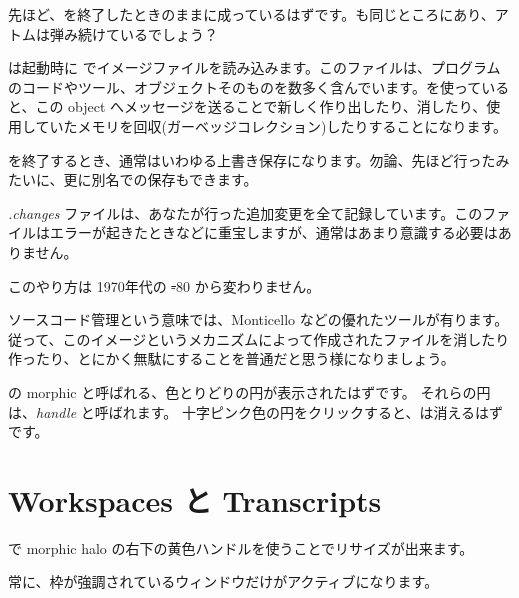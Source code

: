 \documentclass[a4paper,10pt,twoside]{book}
\begin{document}

先ほど、\pharo を終了したときのままに成っているはずです。\bam も同じところにあり、アトムは弾み続けているでしょう？

\pharo は起動時に でイメージファイルを読み込みます。このファイルは、プログラムのコードやツール、オブジェクトそのものを数多く含んでいます。\pharo を使っていると、この object へメッセージを送ることで新しく作り出したり、消したり、使用していたメモリを回収(ガーベッジコレクション)したりすることになります。

\pharo を終了するとき、通常はいわゆる上書き保存になります。勿論、先ほど行ったみたいに、更に別名での保存もできます。

\emph{.changes} ファイルは、あなたが行った追加変更を全て記録しています。このファイルはエラーが起きたときなどに重宝しますが、通常はあまり意識する必要はありません。

このやり方は 1970年代の \st-80 から変わりません。

ソースコード管理という意味では、Monticello などの優れたツールが有ります。従って、このイメージというメカニズムによって作成されたファイルを消したり作ったり、とにかく無駄にすることを普通だと思う様になりましょう。

\bam の morphic  と呼ばれる、色とりどりの円が表示されたはずです。
それらの円は、\emph{handle} と呼ばれます。
十字ピンク色の円をクリックすると、\bam は消えるはずです。

\section{Workspaces と Transcripts}


\metaclick で morphic halo の右下の黄色ハンドルを使うことでリサイズが出来ます。

常に、枠が強調されているウィンドウだけがアクティブになります。
\end{document}
